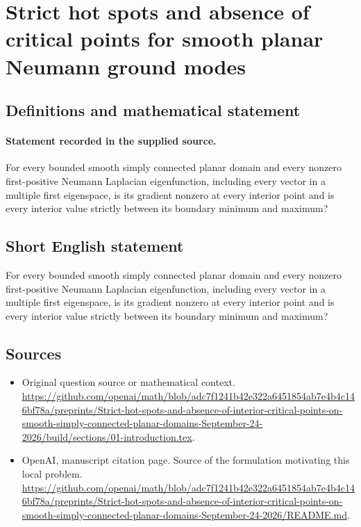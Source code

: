\documentclass[11pt]{article}
\begin{document}
\section*{Strict hot spots and absence of critical points for smooth planar Neumann ground modes}\label{statement}
\subsection{Definitions and mathematical statement}
\paragraph{Statement recorded in the supplied source.}
For every bounded smooth simply connected planar domain and every nonzero first-positive Neumann Laplacian eigenfunction, including every vector in a multiple first eigenspace, is its gradient nonzero at every interior point and is every interior value strictly between its boundary minimum and maximum?
\subsection{Short English statement}
For every bounded smooth simply connected planar domain and every nonzero first-positive Neumann Laplacian eigenfunction, including every vector in a multiple first eigenspace, is its gradient nonzero at every interior point and is every interior value strictly between its boundary minimum and maximum?
\subsection{Sources}
\begin{itemize}
\item[S1] Original question source or mathematical context.
\url{https://github.com/openai/math/blob/adc7f1241b42e322a6451854ab7e4b4c146bf78a/preprints/Strict-hot-spots-and-absence-of-interior-critical-points-on-smooth-simply-connected-planar-domains-September-24-2026/build/sections/01-introduction.tex}.
\item[S2] OpenAI, manuscript citation page. Source of the formulation motivating this local problem.
\url{https://github.com/openai/math/blob/adc7f1241b42e322a6451854ab7e4b4c146bf78a/preprints/Strict-hot-spots-and-absence-of-interior-critical-points-on-smooth-simply-connected-planar-domains-September-24-2026/README.md}.
\end{itemize}
\end{document}
